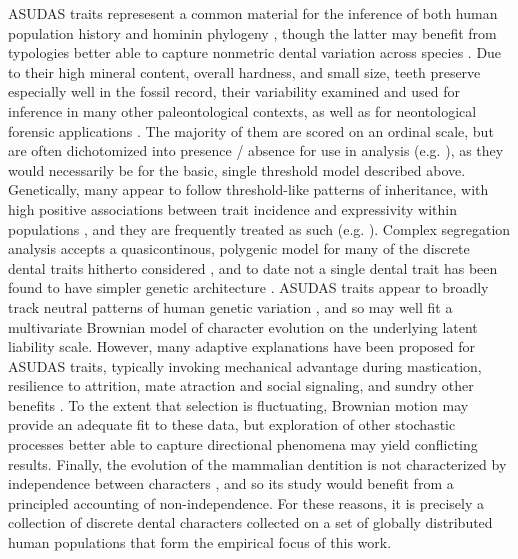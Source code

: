 \documentclass[12pt, twocolumn, twoside]{article}
\begin{document}
ASUDAS traits represesent a common material for the inference of both human population history \citep{hubbardNuclearDNADental2015, rathmannReconstructingHumanPopulation2017, reyes-centenoTestingModernHuman2017} and hominin phylogeny \citep{irishDentalMorphologyPhylogenetic2013a, irishAncientTeethPhenetic2018}, though the latter may benefit from typologies better able to capture nonmetric dental variation across species \citep{baileyNeandertalDentalMorphology2002, carterNewsViewsNonmetric2014}. Due to their high mineral content, overall hardness, and small size, teeth preserve especially well in the fossil record, their variability examined and used for inference in many other paleontological contexts, as well as for neontological forensic applications \citep{scottRASUDASNewWebbased2018}. The majority of them are scored on an ordinal scale, but are often dichotomized into presence / absence for use in analysis (e.g. \citealt{irishDentalMorphologyPhylogenetic2013a}), as they would necessarily be for the basic, single threshold model described above. Genetically, many appear to follow threshold-like patterns of inheritance, with high positive associations between trait incidence and expressivity within populations \citep{scottDentalMorphologyGenetic1973}, and they are frequently treated as such (e.g. \citealt{rathmannTestingUtilityDental2020}). Complex segregation analysis accepts a quasicontinous, polygenic model for many of the discrete dental traits hitherto considered \citep{nicholComplexSegregationAnalysis1989}, and to date not a single dental trait has been found to have simpler genetic architecture \citep{scottAnthropologyModernHuman2018}. ASUDAS traits appear to broadly track neutral patterns of human genetic variation \citep{haniharaMorphologicalVariationMajor2008, rathmannTestingUtilityDental2020}, and so may well fit a multivariate Brownian model of character evolution on the underlying latent liability scale. However, many adaptive explanations have been proposed for ASUDAS traits, typically invoking mechanical advantage during mastication, resilience to attrition, mate atraction and social signaling, and sundry other benefits \citep{scottAnthropologyModernHuman2018}. To the extent that selection is fluctuating, Brownian motion may provide an adequate fit to these data, but exploration of other stochastic processes better able to capture directional phenomena may yield conflicting results. Finally, the evolution of the mammalian dentition is not characterized by independence between characters \citep{brocklehurstDentalCharactersUsed2020}, and so its study would benefit from a principled accounting of non-independence. For these reasons, it is precisely a collection of discrete dental characters collected on a set of globally distributed human populations that form the empirical focus of this work.
\end{document}
